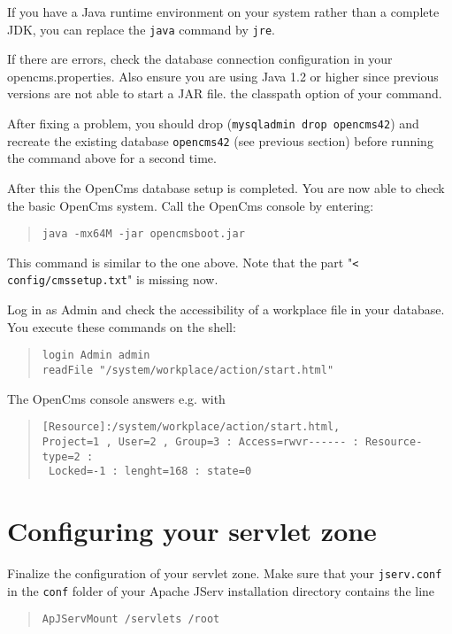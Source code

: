 If you have a Java runtime environment 
on your system rather than a complete JDK, you
can replace the \texttt{java} command by \texttt{jre}.

If there are errors, check the database connection configuration in your
opencms.properties. Also ensure you are using Java 1.2 or higher since
previous versions are not able to start a JAR file.
the classpath option of your command.

After fixing a problem, you should drop (\texttt{mysqladmin drop opencms42}) and recreate 
the existing database \texttt{opencms42} (see previous section) before 
running the command above for a second time.

After this the OpenCms database setup is completed. You are now able to check the basic OpenCms system. 
Call the OpenCms console by entering:

\begin{quote}
\texttt{java -mx64M -jar opencmsboot.jar}
\end{quote}

This command is similar to the one above.
Note that the part "\texttt{< config/cmssetup.txt}" is missing now.

Log in as Admin and check the accessibility of a workplace file in your database. 
You execute these commands on the shell: 

\begin{quote}
\texttt{login Admin admin\\
readFile "/system/workplace/action/start.html"}
\end{quote}

The OpenCms console answers e.g. with

\begin{quote}
\begin{verbatim}
[Resource]:/system/workplace/action/start.html,
Project=1 , User=2 , Group=3 : Access=rwvr------ : Resource-type=2 : 
 Locked=-1 : lenght=168 : state=0
\end{verbatim}
\end{quote}

\section{Configuring your servlet zone}
Finalize the configuration of your servlet zone. Make sure that your \texttt{jserv.conf} in 
the \texttt{conf} folder of your Apache JServ installation directory contains the line

\begin{quote}
\begin{verbatim}
ApJServMount /servlets /root
\end{verbatim}
\end{quote}

